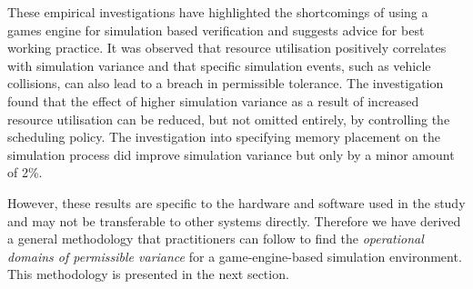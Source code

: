 \documentclass[runningheads,twocolumn,a4paper,10pt]{llncs}
\begin{document}
These empirical investigations have highlighted the shortcomings of using a games engine for simulation based verification and suggests advice for best working practice. 
%
It was observed that resource utilisation positively correlates with simulation variance and that specific simulation events, such as vehicle collisions, can also lead to a breach in permissible tolerance. 
%
The investigation found that the effect of higher simulation variance as a result of increased resource utilisation can be reduced, but not omitted entirely, by controlling the scheduling policy. 
%
The investigation into specifying memory placement on the simulation process did improve simulation variance but only by a minor amount of 2\%.

However, these results are specific to the hardware and software used in the study and may not be transferable to other systems directly. 
%
Therefore we have derived a general methodology that practitioners can follow to find the 
\textit{operational domains of permissible variance} 
for %
a game-engine-based simulation environment. This methodology is presented in the next section. 

\end{document}
